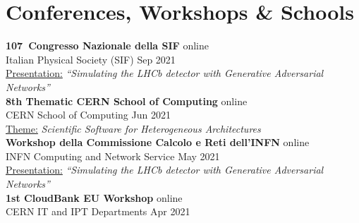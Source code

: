 \newcommand{\event}[2]
  {\large \textbf{\color{hlcolor-0} #1} \hfill {\color{hlcolor-2} #2}}
  
\newcommand{\organizer}[2]
  {\small \color{hlcolor-1} {#1} \hfill {#2}}
  
\newcommand{\contribution}[2][]
  {\normalsize \color{maincolor} \ul{Presentation:} \emph{``#2''} {#1}}
  
\newcommand{\theme}[1]
  {\normalsize \color{maincolor} \ul{Theme:} \emph{#1}}
  
\newcommand{\button}[2]
  {\large \color{maincolor} \href{#1}{#2}}
  

\section*{Conferences, Workshops \& Schools}
\begin{cvcontent}
  \event{107\textdegree\ Congresso Nazionale della SIF}{online}\\
  \organizer{Italian Physical Society (SIF)}{Sep 2021}\\
  \contribution{Simulating the LHCb detector with Generative 
  Adversarial Networks} \hfill
  \button{https://www.sif.it/attivita/congresso/107}{\faGlobe}
  \\ [0.5cm]
  \event{8th Thematic CERN School of Computing}{online}\\
  \organizer{CERN School of Computing}{Jun 2021}\\
  \theme{Scientific Software for Heterogeneous Architectures} \hfill
  \button{https://indico.cern.ch/event/1017080/}{\faGlobe}
  \\ [0.5cm]
  \event{Workshop della Commissione Calcolo e Reti dell'INFN}{online}\\
  \organizer{INFN Computing and Network Service}{May 2021}\\
  \contribution{Simulating the LHCb detector with Generative 
  Adversarial Networks} \hfill
  \button{https://agenda.infn.it/event/25889/contributions/135750/attachments/81865/107438/Simulating\%20the\%20LHCb\%20detector\%20with\%20GAN\%20-\%20WS\%20CCR\%2027.05.2021.pdf}{\faFilePdfO}
  \button{https://agenda.infn.it/event/25889/contributions/135750/}{\faGlobe}
  \\ [0.5cm]
  \event{1st CloudBank EU Workshop}{online}\\
  \organizer{CERN IT and IPT Departments}{Apr 2021}\\

\end{cvcontent}
